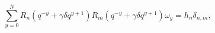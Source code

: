 \[\sum_{y=0}^{N}R_{n}(q^{-y}+\gamma\delta q^{y+1})R_{m}(q^{-y}+\gamma\delta q^{y%
+1})\omega_{y}=h_{n}\delta_{n,m},\]